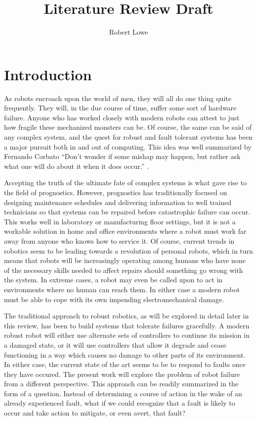 \documentclass[12pt]{article}
\title{Literature Review Draft}
\author{Robert Lowe}
\begin{document}
\maketitle

\section{Introduction}
As robots encroach upon the world of men, they will all do one thing
quite frequently.  They will, in the due course of time, suffer some
sort of hardware failure.  Anyone who has worked closely with modern
robots can attest to just how fragile these mechanized monsters can
be.  Of course, the same can be said of any complex system, and the
quest for robust and fault tolerant systems has been a major pursuit
both in and out of computing.  This idea was well summarized by
Fernando Corbato ``Don't wonder if some mishap may happen, but rather
ask what one will do about it when it does occur.''  \cite{corbato}.

Accepting the truth of the ultimate fate of complex systems is what
gave rise to the field of prognostics.  However, prognostics has
traditionally focused on designing maintenance schedules and
delivering information to well trained technicians so that systems can
be repaired before catastrophic failure can occur.  This works well in
laboratory or manufacturing floor settings, but it is not a workable
solution in home and office environments where a robot must work far
away from anyone who knows how to service it.  Of course, current
trends in robotics seem to be leading towards a revolution of personal
robots, which in turn means that robots will be increasingly operating
among humans who have none of the necessary skills needed to affect
repairs should something go wrong with the system.  In extreme cases,
a robot may even be called upon to act in environments where no human
can reach them.  In either case a modern robot must be able to cope
with its own impending electromechanical damage.

The traditional approach to robust robotics, as will be explored in
detail later in this review, has been to build systems that tolerate
failures gracefully.  A modern robust robot will either use alternate
sets of controllers to continue its mission in a damaged state, or it
will use controllers that allow it degrade and cease functioning in a
way which causes no damage to other parts of its environment.  In
either case, the current state of the art seems to be to respond to
faults once they have occured. The present work will explore the
problem of robot failure from a different perspective. This approach
can be readily summarized in the form of a question.  Instead of
determining a course of action in the wake of an already experienced
fault, what if we could recognize that a fault is likely to occur and
take action to mitigate, or even avert, that fault?
\end{document}
